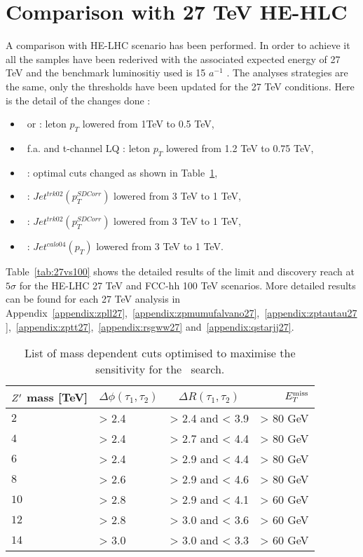 \section{Comparison with 27 TeV HE-HLC}
\label{sec:ana27tev}
A comparison with HE-LHC scenario has been performed.
In order to achieve it all the samples have been rederived with the associated expected energy of 27 TeV and the benchmark luminositiy used is 15 $a^{-1}$ .
\newline
The analyses strategies are the same, only the thresholds have been updated for the 27 TeV conditions. Here is the detail of the changes done :
\begin{itemize}
\item \Zpee\ or \Zpmumu : leton $p_T$ lowered from 1TeV to 0.5 TeV,
\item \Zpmumu\ f.a. and t-channel LQ : leton $p_T$ lowered from  1.2 TeV to 0.75 TeV,
\item \Zptata\ : optimal cuts changed as shown in Table~\ref{tab:leptonicresonances:selectiontautau27},
\item \rsg\ : $Jet^{trk02}(p_T^{SD Corr})$ lowered from 3 TeV to 1 TeV,
\item \zptt\ : $Jet^{trk02}(p_T^{SD Corr})$ lowered from 3 TeV to 1 TeV,
\item \qjj\ : $Jet^{calo04}(p_T)$ lowered from 3 TeV to 1 TeV.
\end{itemize}

Table~\ref{tab:27vs100} shows the detailed results of the limit and discovery reach at $5\sigma$ for the HE-LHC 27 TeV and FCC-hh 100 TeV scenarios. More detailed results can be found for each 27 TeV analysis in Appendix~\ref{appendix:zpll27},~\ref{appendix:zpmumufalvano27},~\ref{appendix:zptautau27},~\ref{appendix:zptt27},~\ref{appendix:rsgww27}  and~\ref{appendix:qstarjj27}.

\begin{table}[htbp]
   \centering
\begin{tabular}{|l|l|c|r|}
  \hline
  \hline
   $Z^{\prime}$ mass [TeV] &  $\Delta \phi(\tau_1, \tau_2)$&  $\Delta R(\tau_1, \tau_2)$ & $E_{T}^{\rm{miss}}$\\
  \hline
   $2$ & > 2.4 & > 2.4 and < 3.9 & > 80 GeV\\
   $4$ & > 2.4 & > 2.7 and < 4.4 & > 80 GeV\\
   $6$ & > 2.4 & > 2.9 and < 4.4 & > 80 GeV\\
   $8$ & > 2.6 & > 2.9 and < 4.6 & > 80 GeV\\
  $10$ & > 2.8 & > 2.9 and < 4.1 & > 60 GeV\\
  $12$ & > 2.8 & > 3.0 and < 3.6 & > 60 GeV\\
  $14$ & > 3.0 & > 3.0 and < 3.3 & > 60 GeV\\
  \hline
  \hline
  \end{tabular}
  \caption{List of mass dependent cuts optimised to maximise the sensitivity for the \Zptata\ search.}
  \label{tab:leptonicresonances:selectiontautau27}
\end{table}

